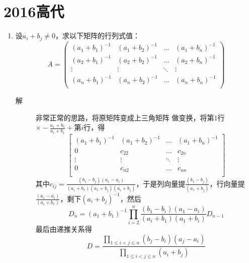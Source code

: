 \section{2016高代}
\begin{enumerate}

\item 设$a_i + b_j \neq 0$，求以下矩阵的行列式值：
\[
A = \left(
\begin{array}{cccc}
(a_1+b_1)^{-1} & (a_1+b_2)^{-1} & \ldots & (a_1+b_n)^{-1} \\
(a_2+b_1)^{-1} & (a_2+b_2)^{-1} & \ldots & (a_2+b_n)^{-1} \\
\vdots & \vdots & \ddots & \vdots \\
(a_n+b_1)^{-1} & (a_n+b_2)^{-1} & \ldots & (a_n+b_n)^{-1} \\
\end{array} \right)
\]
\begin{description}
\item[解] 非常正常的思路，将原矩阵变成上三角矩阵
做变换，将第$1$行$\times -\frac{a_1+b_1}{a_i+b_1} +$第$i$行，得
\[
\left[
\begin{array}{cccc}
(a_1+b_1)^{-1} & (a_1+b_2)^{-1} & \ldots & (a_1+b_n)^{-1} \\
0 & c_{22} & \ldots & c_{2n} \\
\vdots & \vdots & \ddots & \vdots \\
0 & c_{n2} & \ldots & c_{nn} \\
\end{array}\right]
\]
其中$c_{ij} = \frac{(b_1-b_j)(a_1-a_i)}{(a_i+b_1)(a_1+b_j)(a_i+b_j)}$，于是列向量提$\frac{(b_1-b_j)}{(a_1+b_j)}$，行向量提$\frac{(a_1-a_i)}{(a_i+b_1)}$，剩下$(a_i+b_j)^{-1}$，然后
\[
D_n = (a_1+b_1)^{-1}\prod_{i=2}^n\frac{(b_1-b_i)(a_1-a_i)}{(a_i+b_1)(a_1+b_i)}D_{n-1}
\]
最后由递推关系得
\[
D = \frac{\prod_{1\leq i<j\leq n}(b_j-b_i)(a_j-a_i)}{\prod_{1\leq i<j\leq n}(a_i+b_j)}
\]
\end{description}


\end{enumerate}
